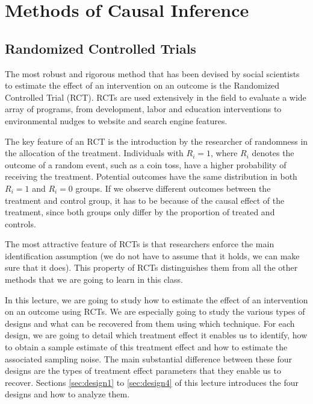 \documentclass[
]{book}
\theoremstyle{definition}
\theoremstyle{definition}
\theoremstyle{definition}
\theoremstyle{definition}
\theoremstyle{remark}
\begin{document}
\hypertarget{part-methods-of-causal-inference}{%
\part{Methods of Causal Inference}\label{part-methods-of-causal-inference}}

\hypertarget{RCT}{%
\chapter{Randomized Controlled Trials}\label{RCT}}

The most robust and rigorous method that has been devised by social scientists to estimate the effect of an intervention on an outcome is the Randomized Controlled Trial (RCT).
RCTs are used extensively in the field to evaluate a wide array of programs, from development, labor and education interventions to environmental nudges to website and search engine features.

The key feature of an RCT is the introduction by the researcher of randomness in the allocation of the treatment.
Individuals with \(R_i=1\), where \(R_i\) denotes the outcome of a random event, such as a coin toss, have a higher probability of receiving the treatment.
Potential outcomes have the same distribution in both \(R_i=1\) and \(R_i=0\) groups.
If we observe different outcomes between the treatment and control group, it has to be because of the causal effect of the treatment, since both groups only differ by the proportion of treated and controls.

The most attractive feature of RCTs is that researchers enforce the main identification assumption (we do not have to assume that it holds, we can make sure that it does).
This property of RCTs distinguishes them from all the other methods that we are going to learn in this class.

In this lecture, we are going to study how to estimate the effect of an intervention on an outcome using RCTs.
We are especially going to study the various types of designs and what can be recovered from them using which technique.
For each design, we are going to detail which treatment effect it enables us to identify, how to obtain a sample estimate of this treatment effect and how to estimate the associated sampling noise.
The main substantial difference between these four designs are the types of treatment effect parameters that they enable us to recover.
Sections \ref{sec:design1} to \ref{sec:design4} of this lecture introduces the four designs and how to analyze them.
\end{document}

